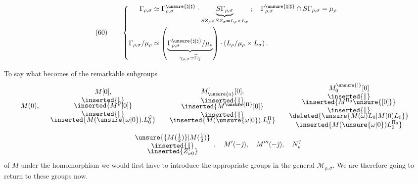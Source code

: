 
\[
(60)\qquad
\left\{\begin{aligned}
\Gamma_{\rho,\sigma}&\simeq
\Gamma_{\rho,\sigma}^{\unsure{\natural|\sharp}}\cdot
\underbrace{S\Gamma_{\rho,\sigma}}_{SZ_{\rho}\times SZ_{\sigma}=L_{\rho}\times L_{\sigma}}
\ ;\quad
\Gamma_{\rho,\sigma}^{\unsure{\natural|\sharp}}\cap S\Gamma_{\rho,\sigma}=\mu_{\rho}
\\
\Gamma_{\rho,\sigma}/\mu_{\rho}&\simeq
\left(\underbrace{\Gamma_{\rho,\sigma}^{\unsure{\natural|\sharp}}/\mu_{\rho}}
_{\gamma_{\rho,\sigma}\simeq\widetilde{\Gamma}_{\mathbb{Q}}}\right)
\cdot\left(L_{\rho}/\mu_{\rho}\times L_{\sigma}\right).
\end{aligned}\right.
\]

To say what becomes of the remarkable subgroups
\[
M(0),\quad
\begin{array}{c}
M[0],\\
\inserted{\Vert}\\[-4pt]
\inserted{M^{\mathcal{G}}[0]}\\
\inserted{\Vert}\\[-4pt]
\inserted{M(\unsure{\omega|0}).L_{0}^{\mathcal{G}}}
\end{array}
\quad
\begin{array}{c}
M_{\unsure{a}}^{!}[0],\\
\inserted{\Vert}\\[-4pt]
\inserted{M^{\unsure{\Pi}}[0]}\\
\inserted{\Vert}\\[-4pt]
\inserted{M(\unsure{\omega|0}).L_{0}^{\Pi}}
\end{array}
\quad
\begin{array}{c}
M_{0}^{\unsure{!}}[0]\\
\inserted{\Vert}\\[-4pt]
\inserted{M^{\Pi_{0}}\unsure{[0]}}\\
\inserted{\Vert}\\[-4pt]
\deleted{\unsure{M(\omega)L_{0}|M(0)L_{0}}}\\
\inserted{M(\unsure{\omega|0})L_{0}^{\Pi_{0}}}
\end{array}
\]
\[
\begin{array}{c}
\unsure{\{M(\tfrac12)\}|M(\tfrac12)}\\
\inserted{\Vert}\\[-4pt]
\inserted{Z_{\sigma0}^{!}}
\end{array},\quad
M'(-\bar{\jmath}),\quad M'''(-\bar{\jmath}),\quad N_{\rho}^{?}
\]
of $M$ under the homomorphism
we would first have to introduce the appropriate groups in the general $\mathcal{M}_{\rho,\sigma}$.
We are therefore going to return to these groups now.

